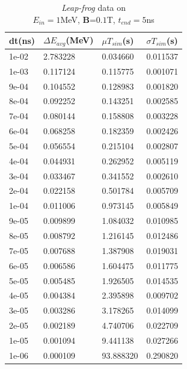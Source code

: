\documentclass[a4paper,oneside,12pt]{report}
\numberwithin{equation}{chapter}
\begin{document}
\begin{table}[H]
    \centering
    \begin{tabular}{|l|l|l|l|}
    \hline
    dt(ns)       & $\Delta E_{avg}$(MeV) & $\mu T_{sim}$(s)    & $\sigma T_{sim}$(s) \\\hline
        1e-02 & 2.783228     & 0.034660  & 0.011537 \\ \hline
        1e-03 & 0.117124     & 0.115775  & 0.001071 \\ \hline
        9e-04 & 0.104552     & 0.128983  & 0.001820 \\  \hline
        8e-04 & 0.092252     & 0.143251  & 0.002585 \\ \hline
        7e-04 & 0.080144     & 0.158808  & 0.003228 \\ \hline
        6e-04 & 0.068258     & 0.182359  & 0.002426 \\\hline
        5e-04 & 0.056554     & 0.215104  & 0.002807 \\\hline
        4e-04 & 0.044931     & 0.262952  & 0.005119 \\\hline
        3e-04 & 0.033467     & 0.341552  & 0.002610 \\\hline
        2e-04 & 0.022158     & 0.501784  & 0.005709 \\\hline
        1e-04 & 0.011006     & 0.973145  & 0.005849 \\\hline
        9e-05 & 0.009899     & 1.084032  & 0.010985 \\\hline
        8e-05 & 0.008792     & 1.216145  & 0.012486 \\\hline
        7e-05 & 0.007688     & 1.387908  & 0.019031 \\\hline
        6e-05 & 0.006586     & 1.604475  & 0.011775 \\\hline
        5e-05 & 0.005485     & 1.926505  & 0.014535 \\\hline
        4e-05 & 0.004384     & 2.395898  & 0.009702 \\\hline
        3e-05 & 0.003286     & 3.178265  & 0.014099 \\\hline
        2e-05 & 0.002189     & 4.740706  & 0.022709 \\\hline
        1e-05 & 0.001094     & 9.441138  & 0.027266 \\\hline
        1e-06 & 0.000109     & 93.888320 & 0.290820 \\ \hline
    \end{tabular}
    \caption{\textit{Leap-frog} data on \\$E_{in}=1$MeV, \textbf{B}=$0.1$T, $t_{end}=5$ns}
    \label{tab:lf_mag_table}
\end{table}
\end{document}
